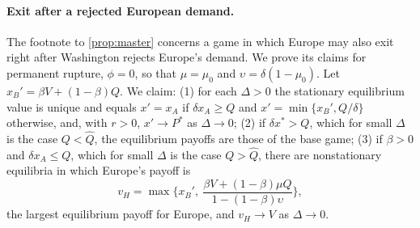 \paragraph{Exit after a rejected European demand.} The footnote to \cref{prop:master} concerns a game in which Europe may also exit right after Washington rejects Europe's demand. We prove its claims for permanent rupture, $\phi=0$, so that $\mu=\mu_0$ and $\upsilon=\delta(1-\mu_0)$. Let $x_B'=\beta V+(1-\beta)Q$. We claim: (1) for each $\Delta>0$ the stationary equilibrium value is unique and equals $x'=x_A$ if $\delta x_A\ge Q$ and $x'=\min\{x_B',Q/\delta\}$ otherwise, and, with $r>0$, $x'\to P^*$ as $\Delta\to 0$; (2) if $\delta x^*>Q$, which for small $\Delta$ is the case $Q<\hat Q$, the equilibrium payoffs are those of the base game; (3) if $\beta>0$ and $\delta x_A\le Q$, which for small $\Delta$ is the case $Q>\hat Q$, there are nonstationary equilibria in which Europe's payoff is
\[
v_H=\max\Big\{x_B',\ \frac{\beta V+(1-\beta)\mu Q}{1-(1-\beta)\upsilon}\Big\},
\]
the largest equilibrium payoff for Europe, and $v_H\to V$ as $\Delta\to0$.


